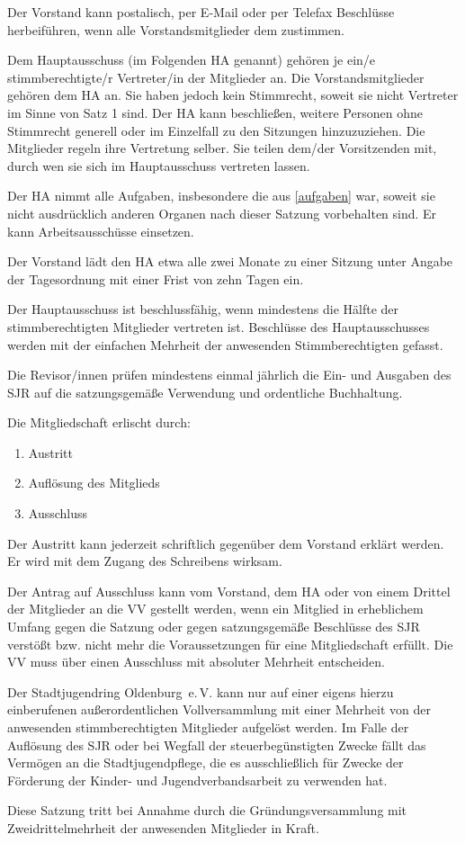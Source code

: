 \documentclass[10pt,a4paper,oneside,parskip=half]{scrartcl}
\begin{document}
\begin{contract}
Der Vorstand kann postalisch, per E-Mail oder per Telefax Beschlüsse herbeiführen, wenn alle Vorstandsmitglieder dem zustimmen.

Dem Hauptausschuss (im Folgenden HA genannt) gehören je ein/e stimmberechtigte/r Vertreter/in der Mitglieder an. Die Vorstandsmitglieder gehören dem HA an. Sie haben jedoch kein Stimmrecht, soweit sie nicht Vertreter im Sinne von Satz 1 sind. Der HA kann beschließen, weitere Personen ohne Stimmrecht generell oder im Einzelfall zu den Sitzungen hinzuzuziehen. Die Mitglieder regeln ihre Vertretung selber. Sie teilen dem/der Vorsitzenden mit, durch wen sie sich im Hauptausschuss vertreten lassen.

Der HA nimmt alle Aufgaben, insbesondere die aus \ref{aufgaben} war, soweit sie nicht ausdrücklich anderen Organen nach dieser Satzung vorbehalten sind. Er kann Arbeitsausschüsse einsetzen.

Der Vorstand lädt den HA etwa alle zwei Monate zu einer Sitzung unter Angabe der Tagesordnung mit einer Frist von zehn Tagen ein.

Der Hauptausschuss ist beschlussfähig, wenn mindestens die Hälfte der stimmberechtigten Mitglieder vertreten ist. Beschlüsse des Hauptausschusses werden mit der einfachen Mehrheit der anwesenden Stimmberechtigten gefasst.

Die Revisor/innen prüfen mindestens einmal jährlich die Ein- und Ausgaben des SJR auf die satzungsgemäße Verwendung und ordentliche Buchhaltung.

\label{mitgliedschaftsende}
Die Mitgliedschaft erlischt durch:
\begin{enumerate}
\item Austritt
\item Auflösung des Mitglieds
\item Ausschluss
\end{enumerate}

Der Austritt kann jederzeit schriftlich gegenüber dem Vorstand erklärt werden. Er wird mit dem Zugang des Schreibens wirksam.

Der Antrag auf Ausschluss kann vom Vorstand, dem HA oder von einem Drittel der Mitglieder an die VV gestellt werden, wenn ein Mitglied in erheblichem Umfang gegen die Satzung oder gegen satzungsgemäße Beschlüsse des SJR verstößt bzw. nicht mehr die Voraussetzungen für eine Mitgliedschaft erfüllt. Die VV muss über einen Ausschluss mit absoluter Mehrheit entscheiden.

Der Stadtjugendring Oldenburg~e.\,V. kann nur auf einer eigens hierzu einberufenen außerordentlichen Vollversammlung mit einer Mehrheit von  der anwesenden stimmberechtigten Mitglieder aufgelöst werden.
Im Falle der Auflösung des SJR oder bei Wegfall der steuerbegünstigten Zwecke fällt das Vermögen an die Stadtjugendpflege, die es ausschließlich für Zwecke der Förderung der Kinder- und Jugendverbandsarbeit zu verwenden hat.

Diese Satzung tritt bei Annahme durch die Gründungsversammlung mit Zweidrittelmehrheit der anwesenden Mitglieder in Kraft.

\end{contract}
\end{document}
